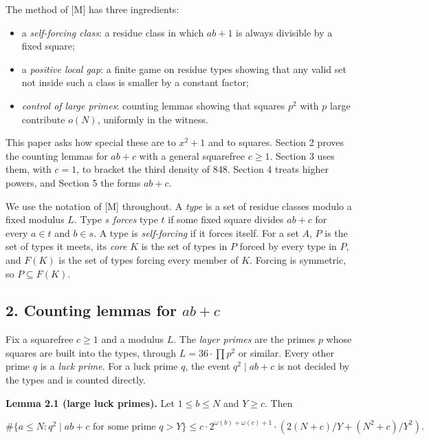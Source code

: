 \documentclass[
  11pt,
]{article}
\providecommand{\tightlist}{%
  \setlength{\itemsep}{0pt}\setlength{\parskip}{0pt}}
\begin{document}
The method of {[}M{]} has three ingredients:

\begin{itemize}
\tightlist
\item
  a \emph{self-forcing class}: a residue class in which \(ab + 1\) is
  always divisible by a fixed square;
\item
  a \emph{positive local gap}: a finite game on residue types showing
  that any valid set not inside such a class is smaller by a constant
  factor;
\item
  \emph{control of large primes}: counting lemmas showing that squares
  \(p^2\) with \(p\) large contribute \(o(N)\), uniformly in the
  witness.
\end{itemize}

This paper asks how special these are to \(x^2 + 1\) and to squares.
Section 2 proves the counting lemmas for \(ab + c\) with a general
squarefree \(c \ge 1\). Section 3 uses them, with \(c = 1\), to bracket
the third density of 848. Section 4 treats higher powers, and Section 5
the forms \(ab + c\).

We use the notation of {[}M{]} throughout. A \emph{type} is a set of
residue classes modulo a fixed modulus \(L\). Type \(s\) \emph{forces}
type \(t\) if some fixed square divides \(ab + c\) for every \(a \in t\)
and \(b \in s\). A type is \emph{self-forcing} if it forces itself. For
a set \(A\), \(P\) is the set of types it meets, its \emph{core} \(K\)
is the set of types in \(P\) forced by every type in \(P\), and \(F(K)\)
is the set of types forcing every member of \(K\). Forcing is symmetric,
so \(P \subseteq F(K)\).

\subsection{\texorpdfstring{2. Counting lemmas for
\(ab + c\)}{2. Counting lemmas for ab + c}}

Fix a squarefree \(c \ge 1\) and a modulus \(L\). The \emph{layer
primes} are the primes \(p\) whose squares are built into the types,
through \(L = 36\cdot\prod p^2\) or similar. Every other prime \(q\) is
a \emph{luck prime}. For a luck prime \(q\), the event
\(q^2 \mid ab + c\) is not decided by the types and is counted directly.

\textbf{Lemma 2.1 (large luck primes).} Let \(1 \le b \le N\) and
\(Y \ge c\). Then

\[\#\{a \le N : q^2 \mid ab + c \text{ for some prime } q > Y\} \le c\cdot 2^{\omega(b)+\omega(c)+1}\cdot\left(2(N + c)/Y + (N^2 + c)/Y^2\right).\]
\end{document}
